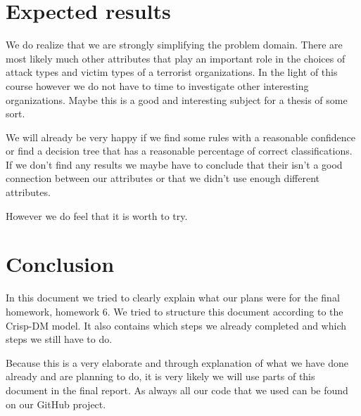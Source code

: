 \documentclass[a4]{article}
\begin{document}
\section{Expected results}
\label{sec:results}
We do realize that we are strongly simplifying the problem domain. There are most likely much other attributes that play an important role in the choices of attack types and victim types of a terrorist organizations. In the light of this course however we do not have to time to investigate other interesting organizations. Maybe this is a good and interesting subject for a thesis of some sort.\par
We will already be very happy if we find some rules with a reasonable confidence or find a decision tree that has a reasonable percentage of correct classifications. If we don't find any results we maybe have to conclude that their isn't a good connection between our attributes or that we didn't use enough different attributes.\par However we do feel that it is worth to try.
\section{Conclusion}
\label{sec:conclusion}
In this document we tried to clearly explain what our plans were for the final homework, homework 6. We tried to structure this document according to the Crisp-DM model. It also contains which steps we already completed and which steps we still have to do.\par
Because this is a very elaborate and through explanation of what we have done already and are planning to do, it is very likely we will use parts of this document in the final report. As always all our code that we used can be found on our GitHub project\cite{githubproject}.
\printbibliography
\end{document}
